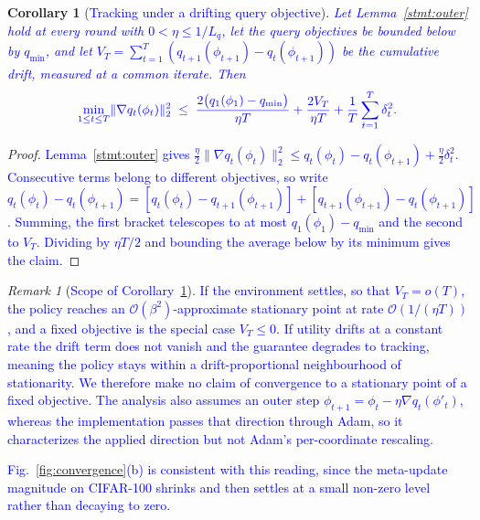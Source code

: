 \documentclass[journal]{IEEEtran}
\newtheorem{corollary}{Corollary}
\theoremstyle{remark}
\newtheorem{remark}{Remark}
\newcommand{\revtwo}[1]{\textcolor{blue}{#1}}
\newcommand{\revtwoeq}{\color{blue}}
\begin{document}
{\begin{corollary}[\revtwo{Tracking under a drifting query objective}]\label{cor:rate}
\revtwo{Let Lemma~\ref{stmt:outer} hold at every round with $0<\eta\le 1/L_q$, let the query objectives be bounded below by $q_{\min}$, and let $V_T=\sum_{t=1}^{T}(q_{t+1}(\phi_{t+1})-q_t(\phi_{t+1}))$ be the cumulative drift, measured at a common iterate. Then}
\[
\revtwoeq \min_{1\le t\le T}\lVert\nabla q_t(\phi_t)\rVert_2^2\;\le\;
\frac{2\bigl(q_1(\phi_1)-q_{\min}\bigr)}{\eta T}+\frac{2V_T}{\eta T}+\frac{1}{T}\sum_{t=1}^{T}\delta_t^2 .
\]
\end{corollary}
\begin{proof}
\revtwo{Lemma~\ref{stmt:outer} gives $\tfrac{\eta}{2}\lVert\nabla q_t(\phi_t)\rVert_2^2\le q_t(\phi_t)-q_t(\phi_{t+1})+\tfrac{\eta}{2}\delta_t^2$. Consecutive terms belong to different objectives, so write $q_t(\phi_t)-q_t(\phi_{t+1})=[q_t(\phi_t)-q_{t+1}(\phi_{t+1})]+[q_{t+1}(\phi_{t+1})-q_t(\phi_{t+1})]$. Summing, the first bracket telescopes to at most $q_1(\phi_1)-q_{\min}$ and the second to $V_T$. Dividing by $\eta T/2$ and bounding the average below by its minimum gives the claim.}
\end{proof}

\begin{remark}[\revtwo{Scope of Corollary~\ref{cor:rate}}]\label{rem:reading}
\revtwo{If the environment settles, so that $V_T=o(T)$, the policy reaches an $\mathcal{O}(\beta^2)$-approximate stationary point at rate $\mathcal{O}(1/(\eta T))$, and a fixed objective is the special case $V_T\le 0$. If utility drifts at a constant rate the drift term does not vanish and the guarantee degrades to tracking, meaning the policy stays within a drift-proportional neighbourhood of stationarity. We therefore make no claim of convergence to a stationary point of a fixed objective. The analysis also assumes an outer step $\phi_{t+1}=\phi_t-\eta\nabla q_t(\phi'_t)$, whereas the implementation passes that direction through Adam, so it characterizes the applied direction but not Adam's per-coordinate rescaling.}
\end{remark}
\color{black}
\revtwo{Fig.~\ref{fig:convergence}(b) is consistent with this reading, since the meta-update magnitude on CIFAR-100 shrinks and then settles at a small non-zero level rather than decaying to zero.}
}
\end{document}
